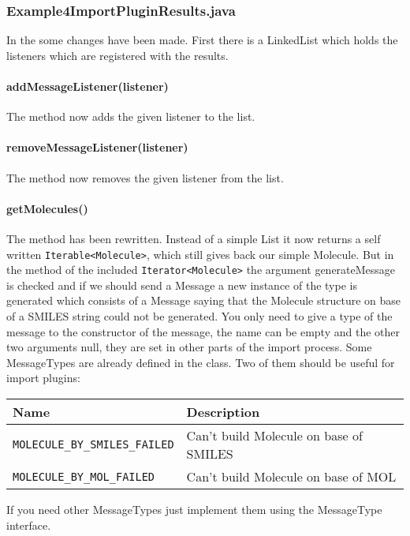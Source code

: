 \subsubsection{Example4ImportPluginResults.java}
In the  some changes have been made. First there is a LinkedList which holds the listeners which are registered with the results.

\paragraph{addMessageListener(listener)}
The  method now adds the given listener to the  list.

\paragraph{removeMessageListener(listener)}
The  method now removes the given listener from the  list.

\paragraph{getMolecules()}
The  method has been rewritten. Instead of a simple List it now returns a self written \verb+Iterable<Molecule>+, which still gives back our simple Molecule. But in the  method of the included \verb+Iterator<Molecule>+ the argument generateMessage is checked and if we should send a Message a new instance of the type  is generated which consists of a Message saying that the Molecule structure on base of a SMILES string could not be generated.
You only need to give a type of the message to the constructor of the message, the name can be empty and the other two arguments null, they are set in other parts of the import process. Some MessageTypes are already  defined in the  class. Two of them should be useful for import plugins:\\
\begin{table}[!htb]
  \begin{tabular}{ll}
    \textbf{Name}	& \textbf{Description}\\ \toprule
    \verb+MOLECULE_BY_SMILES_FAILED+	& Can't build Molecule on base of SMILES\\ \midrule
    \verb+MOLECULE_BY_MOL_FAILED+	& Can't build Molecule on base of MOL\\ \bottomrule
  \end{tabular}
\end{table}
If you need other MessageTypes just implement them using the MessageType interface.
